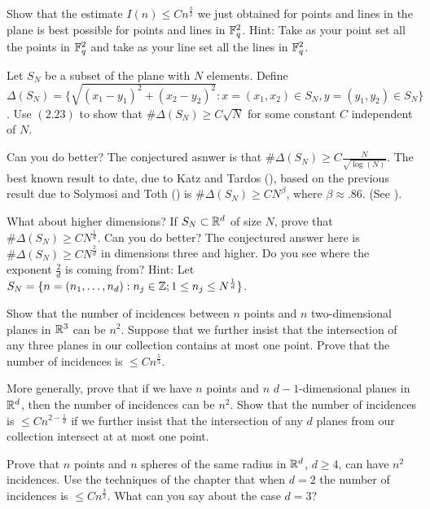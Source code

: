  Show that the estimate $I(n) \leq
Cn^{\frac{3}{2}}$ we just obtained for points and lines in the plane is
best possible for points and lines in ${\Bbb F}_q^2$. Hint: Take as your
point set all the points in ${\Bbb F}_q^2$ and take as your line set all
the lines in ${\Bbb F}_q^2$. \endproclaim

 Let $S_N$ be a subset of the plane with $N$
elements. Define $\Delta(S_N)=\{\sqrt{{(x_1-y_1)}^2+{(x_2-y_2)}^2}:
x=(x_1,x_2) \in S_N, y=(y_1,y_2) \in S_N\}$. Use $(2.23)$ to show that
$\# \Delta(S_N) \ge C \sqrt{N}$ for some constant $C$ independent of $N$.

Can you do better? The conjectured asnwer is that $\# \Delta(S_N) \ge
C\frac{N}{\sqrt{\log(N)}}$. The best known result to date, due to Katz
and Tardos (\cite{KT04}), based on the previous result due to Solymosi and
Toth (\cite{SoT01}) is $\# \Delta(S_N) \ge CN^{\beta}$, where $\beta
\approx .86$. (See \cite{KT04}).

What about higher dimensions? If $S_N \subset {\Bbb R}^d$ of size $N$,
prove that $\# \Delta(S_N) \ge CN^{\frac{1}{d}}$. Can you do better? The
conjectured answer here is $\# \Delta(S_N) \ge CN^{\frac{2}{d}}$ in
dimensions three and higher. Do you see where the exponent $\frac{2}{d}$
is coming from? Hint: Let $S_N=\{n=(n_1, \dots, n_d): n_j \in {\Bbb Z}; 1
\leq n_j \leq N^{\frac{1}{d}} \}$.

\endproclaim

 Show that the number of incidences between $n$
points and $n$ two-dimensional planes in ${\Bbb R}^3$ can be $n^2$.
Suppose that we further insist that the intersection of any three planes
in our collection contains at most one point. Prove that the number of
incidences is $\leq Cn^{\frac{5}{3}}$.

More generally, prove that if we have $n$ points and $n$
$d-1$-dimensional planes in ${\Bbb R}^d$, then the number of incidences
can be $n^2$. Show that the number of incidences is $\leq
Cn^{2-\frac{1}{d}}$ if we further insist that the intersection of any $d$
planes from our collection intersect at at most one point.
\endproclaim

 Prove that $n$ points and $n$ spheres of the
same radius in ${\Bbb R}^d$, $d \ge 4$, can have $n^2$ incidences. Use
the techniques of the chapter that when $d=2$ the number of incidences is
$\leq Cn^{\frac{3}{2}}$. What can you say about the case
$d=3$? \endproclaim

